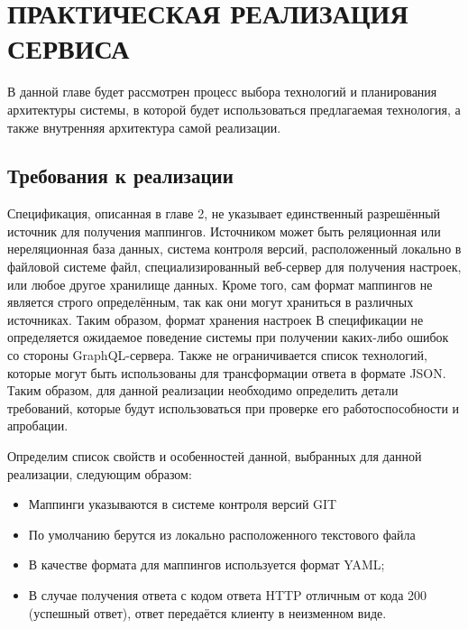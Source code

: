 \chapter{ПРАКТИЧЕСКАЯ РЕАЛИЗАЦИЯ СЕРВИСА}\label{ch:ch3-implementation}

В данной главе будет рассмотрен процесс выбора технологий и планирования архитектуры системы, в которой будет использоваться предлагаемая технология, а также внутренняя архитектура самой реализации.


\section{Требования к реализации}\label{sec:implementation-requirements}

Спецификация, описанная в главе 2, не указывает единственный разрешённый источник для получения маппингов.
Источником может быть реляционная или нереляционная база данных, система контроля версий, расположенный локально в файловой системе файл, специализированный веб-сервер для получения настроек, или любое другое хранилище данных.
Кроме того, сам формат маппингов не является строго определённым, так как они могут храниться в различных источниках.
Таким образом, формат хранения настроек
В спецификации не определяется ожидаемое поведение системы при получении каких-либо ошибок со стороны GraphQL-сервера.
Также не ограничивается список технологий, которые могут быть использованы для трансформации ответа в формате JSON\@.
Таким образом, для данной реализации необходимо определить детали требований, которые будут использоваться при проверке его работоспособности и апробации.

Определим список свойств и особенностей данной, выбранных для данной реализации, следующим образом:
\begin{itemize}
	\item Маппинги указываются в системе контроля версий GIT
	\item По умолчанию берутся из локально расположенного текстового файла
	\item В качестве формата для маппингов используется формат YAML;
	\item В случае получения ответа с кодом ответа HTTP отличным от кода 200 (успешный ответ), ответ передаётся клиенту в неизменном виде.
\end{itemize}



